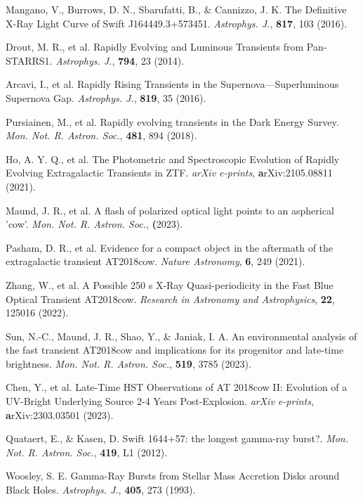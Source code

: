 \documentclass{nature_plusfigure}
\newcommand{\mn}{{Mon. Not. R. Astron. Soc.}}
\newcommand{\mnras}{\mn}
\newcommand{\apj}{{Astrophys. J.}}
\begin{document}
\begin{thebibliography}{100}
 Mangano, V., Burrows, D. N., Sbarufatti, B., \& Cannizzo, J. K. The Definitive X-Ray Light Curve of Swift J164449.3+573451. \emph{\apj}, \textbf{817}, 103 (2016). 


 Drout, M. R., et al. Rapidly Evolving and Luminous Transients from Pan-STARRS1. \emph{\apj}, \textbf{794}, 23 (2014). 

 Arcavi, I., et al. Rapidly Rising Transients in the Supernova—Superluminous Supernova Gap. \emph{\apj}, \textbf{819}, 35 (2016). 

 Pursiainen, M., et al. Rapidly evolving transients in the Dark Energy Survey. \emph{\mnras}, \textbf{481}, 894 (2018). 

 Ho, A. Y. Q., et al. The Photometric and Spectroscopic Evolution of Rapidly Evolving Extragalactic Transients in ZTF. \emph{arXiv e-prints}, \textbf arXiv:2105.08811 (2021). 

 Maund, J. R., et al. A flash of polarized optical light points to an aspherical 'cow'. \emph{\mnras}, \textbf (2023). 

 Pasham, D. R., et al. Evidence for a compact object in the aftermath of the extragalactic transient AT2018cow. \emph{Nature Astronomy}, \textbf{6}, 249 (2021). 

 Zhang, W., et al. A Possible 250 s X-Ray Quasi-periodicity in the Fast Blue Optical Transient AT2018cow. \emph{Research in Astronomy and Astrophysics}, \textbf{22}, 125016 (2022). 

 Sun, N.-C., Maund, J. R., Shao, Y., \& Janiak, I. A. An environmental analysis of the fast transient AT2018cow and implications for its progenitor and late-time brightness. \emph{\mnras}, \textbf{519}, 3785 (2023). 

 Chen, Y., et al. Late-Time HST Observations of AT 2018cow II: Evolution of a UV-Bright Underlying Source 2-4 Years Post-Explosion. \emph{arXiv e-prints}, \textbf arXiv:2303.03501 (2023). 


 Quataert, E., \& Kasen, D. Swift 1644+57: the longest gamma-ray burst?. \emph{\mnras}, \textbf{419}, L1 (2012). 

 Woosley, S. E. Gamma-Ray Bursts from Stellar Mass Accretion Disks around Black Holes. \emph{\apj}, \textbf{405}, 273 (1993). 


\end{thebibliography}
\end{document}
